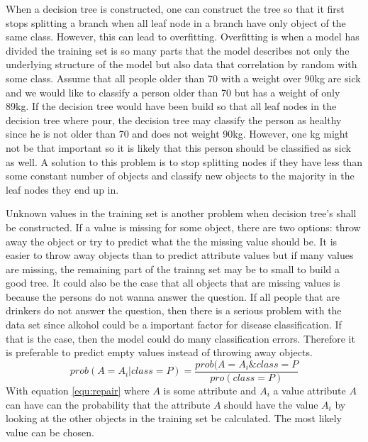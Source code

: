 \documentclass{article}
\begin{document}
When a decision tree is constructed, one can construct the tree so that it first stops splitting a branch when all leaf node in a branch have only object of the same class. However, this can lead to overfitting. Overfitting is when a model has divided the training set is so many parts that the model describes not only the underlying structure of the model but also data that correlation by random with some class. Assume that all people older than 70  with a weight over 90kg are sick and we would like to classify a  person older than 70 but has a weight of only 89kg. If the decision tree would have been build so that all leaf nodes in the decision tree where pour, the decision tree may classify the person as healthy since he is not older than 70  and does not weight 90kg. However, one kg might not be that important so it is likely that this person should be classified as sick as well. A solution to this problem is to stop splitting nodes if they have less than some constant number of objects and classify new objects to the majority in the leaf nodes they end up in.

Unknown values in the training set is another problem when decision tree's shall be constructed. If a value is missing for some object, there are two options: throw away the object or try to predict what the the missing value should be. It is easier to throw away objects than to predict attribute values but if many values are missing, the remaining part of the trainng set may be to small to build a good tree. It could also be the case that all objects that are missing values is because the persons do not wanna answer the question. If all people that are drinkers do not answer the question, then there is a serious problem with the data set since alkohol could be a important factor for disease classification. If that is the case, then the model could do many classification errors. Therefore it is preferable to predict empty values instead of throwing away objects.
\begin{equation} \label{equ:repair}
    prob(A = A_i | class = P ) = \frac{prob(A = A_i \& class = P}{pro(class = P)}
\end{equation}
With equation \ref{equ:repair} where $A$ is some attribute and $A_i$ a value attribute $A$ can have can the probability that the attribute $A$ should have the value $A_i$ by looking at the other objects in the training set be calculated. The most likely value can be chosen.
\end{document}
